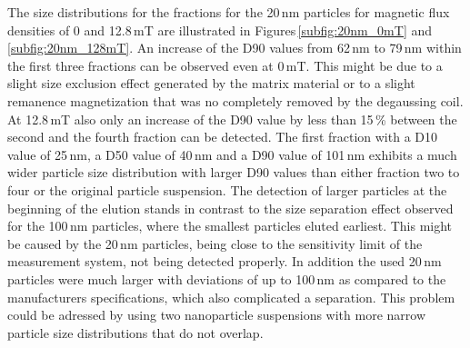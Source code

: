 The size distributions for the fractions for the 20\,nm particles for magnetic flux densities of 0 and 12.8\,mT are illustrated in Figures\,\ref{subfig:20nm_0mT} and \ref{subfig:20nm_128mT}. An increase of the D90 values from 62\,nm to 79\,nm within the first three fractions can be observed even at 0\,mT. This might be due to a slight size exclusion effect generated by the matrix material or to a slight remanence magnetization that was no completely removed by the degaussing coil. At 12.8\,mT  also only an increase of the D90 value by less than 15\,\% between the second and the fourth fraction can be detected. The first fraction with a D10 value of 25\,nm, a D50 value of 40\,nm and a D90 value of 101\,nm exhibits a much wider particle size distribution with larger D90 values than either fraction two to four or the original particle suspension. The detection of larger particles at the beginning of the elution stands in contrast to the size separation effect observed for the 100\,nm particles, where the smallest particles eluted earliest. This might be caused by the 20\,nm particles, being close to the sensitivity limit of the measurement system, not being detected properly. In addition the used 20\,nm particles were much larger with deviations of up to 100\,nm as compared to the manufacturers specifications, which also complicated a separation. This problem could be adressed by using two nanoparticle suspensions with more narrow particle size distributions that do not overlap.  

